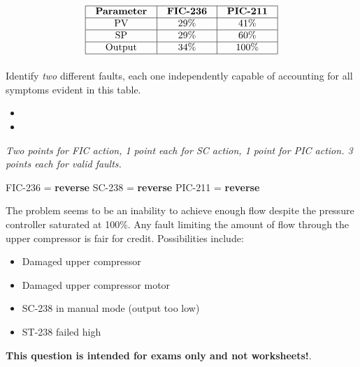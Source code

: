 
$$\vbox{\offinterlineskip
\halign{\strut
\vrule \quad\hfil # \ \hfil & 
\vrule \quad\hfil # \ \hfil & 
\vrule \quad\hfil # \ \hfil \vrule \cr
\noalign{\hrule}
%
{\bf Parameter} & {\bf FIC-236} & {\bf PIC-211}  \cr
%
\noalign{\hrule}
%
PV & 29\% & 41\%  \cr
%
\noalign{\hrule}
%
SP & 29\% & 60\%  \cr
%
\noalign{\hrule}
%
Output & 34\% & 100\%  \cr
%
\noalign{\hrule}
} %
}$$ %

Identify {\it two} different faults, each one independently capable of accounting for all symptoms evident in this table.

\begin{itemize}
\item{} 
\vskip 50pt
\item{} 
\end{itemize}






{\it Two points for FIC action, 1 point each for SC action, 1 point for PIC action.  3 points each for valid faults.}

\vskip 10pt

FIC-236 = {\bf reverse} \hskip 50pt SC-238 = {\bf reverse} \hskip 50pt PIC-211 = {\bf reverse}

\vskip 10pt

The problem seems to be an inability to achieve enough flow despite the pressure controller saturated at 100\%.  Any fault limiting the amount of flow through the upper compressor is fair for credit.  Possibilities include:

\begin{itemize}
\item{} Damaged upper compressor
\item{} Damaged upper compressor motor
\item{} SC-238 in manual mode (output too low)
\item{} ST-238 failed high
\end{itemize}







{\bf This question is intended for exams only and not worksheets!}.



